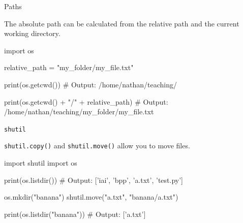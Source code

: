 \begin{frame}[fragile]{Paths}

    The absolute path can be calculated from the relative path and the current working directory.

    \begin{pythoncode}

import os

relative_path = "my_folder/my_file.txt"

print(os.getcwd())
# Output: /home/nathan/teaching/

print(os.getcwd() + "/" + relative_path)
# Output: /home/nathan/teaching/my_folder/my_file.txt

    \end{pythoncode}



\end{frame}

\begin{frame}[fragile]{\texttt{shutil}}

    \texttt{shutil.copy()} and \texttt{shutil.move()} allow you to move files.

    \begin{pythoncode}

import shutil
import os

print(os.listdir())
# Output: ['iai', 'bpp', 'a.txt', 'test.py']

os.mkdir("banana")
shutil.move("a.txt", "banana/a.txt")

print(os.listdir("banana"))
# Output: ['a.txt']

    \end{pythoncode}


\end{frame}


